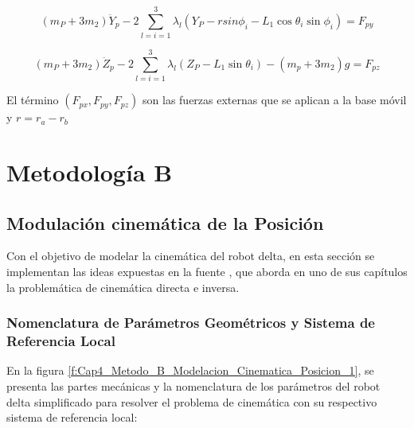     \begin{equation}
     \left( m_{P}+3m_{2} \right) \ddot{Y}_{p}-2 \sum _{l=i=1}^{3} \lambda _{l} \left( Y_{P}- rsin \phi _{i}-L_{1}\cos  \theta _{i}\sin  \phi _{i} \right) =F_{py} 
        \label{eq:cap4_dina_ma_13}
    \end{equation}

    \begin{equation}
      \left( m_{P}+3m_{2} \right) \ddot{Z}_{p}-2 \sum _{l=i=1}^{3} \lambda _{l} \left( Z_{P}-L_{1}\sin  \theta _{i} \right) - \left( m_{p}+3m_{2} \right) g=F_{pz} 
        \label{eq:cap4_dina_ma_14}
    \end{equation}

    El término $ \left( F_{px},F_{py},F_{pz} \right)$ son las fuerzas externas que se aplican a la base móvil y   $r=r_{a}-r_{b} $







    \newpage


\section{Metodología B}

    \subsection{Modulación cinemática de la Posición}\label{MB_MP}
    
            Con el objetivo de modelar la cinemática del robot delta, en esta sección se implementan las ideas expuestas en la fuente \cite{Path_Planning_and_Trajectory_Optimization}, que aborda en uno de sus capítulos la problemática de cinemática directa e inversa.
    
        \subsubsection{Nomenclatura de Parámetros Geométricos y Sistema de Referencia Local}

            En la figura \ref{f:Cap4_Metodo_B_Modelacion_Cinematica_Posicion_1}, se presenta las partes mecánicas y la nomenclatura de los parámetros del robot delta simplificado para resolver el problema de cinemática con su respectivo sistema de referencia local:


